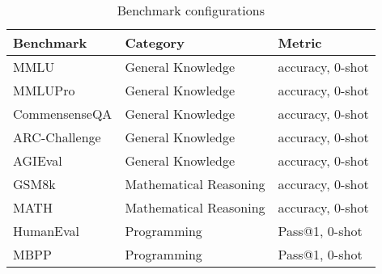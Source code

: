 \begin{table}[t]
\caption{Benchmark configurations}
\label{tab:dataset_desc}
\centering
\begin{tabular}{l|ll}
\hline
Benchmark     & Category                   & Metric\\ \hline
MMLU          & General Knowledge           & accuracy, 0-shot\\
MMLUPro       & General Knowledge          & accuracy, 0-shot\\
CommensenseQA & General Knowledge           & accuracy, 0-shot\\
ARC-Challenge & General Knowledge          & accuracy, 0-shot\\
AGIEval       & General Knowledge           & accuracy, 0-shot\\
GSM8k         & Mathematical Reasoning & accuracy, 0-shot\\
MATH          & Mathematical Reasoning & accuracy, 0-shot\\
HumanEval     & Programming            & Pass@1, 0-shot\\
MBPP          & Programming            & Pass@1, 0-shot\\ \hline
\end{tabular}
\end{table}


